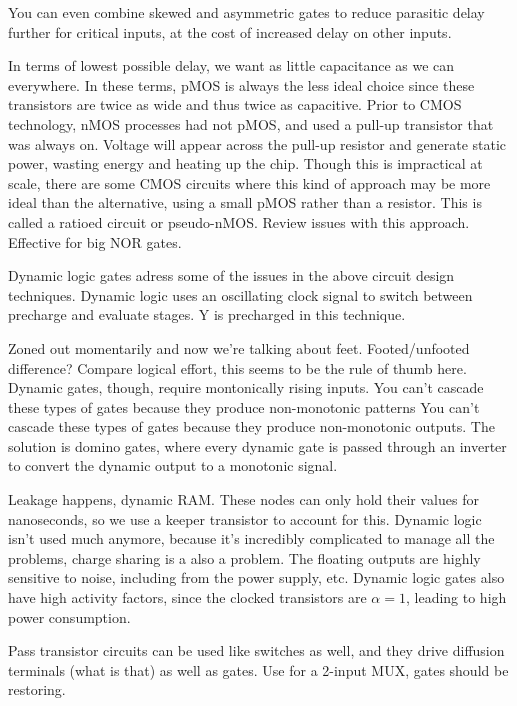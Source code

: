 \documentclass{article}
\begin{document}
You can even combine skewed and asymmetric gates to reduce parasitic delay further for critical inputs, at the cost of increased delay on other inputs. 

In terms of lowest possible delay, we want as little capacitance as we can everywhere. In these terms, pMOS is always the less ideal choice since these transistors are twice as wide and thus twice as capacitive. Prior to CMOS technology, nMOS processes had not pMOS, and used a pull-up transistor that was always on. Voltage will appear across the pull-up resistor and generate static power, wasting energy and heating up the chip. Though this is impractical at scale, there are some CMOS circuits where this kind of approach may be more ideal than the alternative, using a small pMOS rather than a resistor. This is called a ratioed circuit or pseudo-nMOS. Review issues with this approach. Effective for big NOR gates.

Dynamic logic gates adress some of the issues in the above circuit design techniques. Dynamic logic uses an oscillating clock signal to switch between precharge and evaluate stages. Y is precharged in this technique.

Zoned out momentarily and now we're talking about feet. Footed/unfooted difference? Compare logical effort, this seems to be the rule of thumb here. Dynamic gates, though, require montonically rising inputs. You can't cascade these types of gates because they produce non-monotonic patterns You can't cascade these types of gates because they produce non-monotonic outputs. The solution is domino gates, where every dynamic gate is passed through an inverter to convert the dynamic output to a monotonic signal.

Leakage happens, dynamic RAM. These nodes can only hold their values for nanoseconds, so we use a keeper transistor to account for this. Dynamic logic isn't used much anymore, because it's incredibly complicated to manage all the problems, charge sharing is a also a problem. The floating outputs are highly sensitive to noise, including from the power supply, etc. Dynamic logic gates also have high activity factors, since the clocked transistors are \(\alpha = 1\), leading to high power consumption. 

Pass transistor circuits can be used like switches as well, and they drive diffusion terminals (what is that) as well as gates. Use for a 2-input MUX, gates should be restoring.
\end{document}
